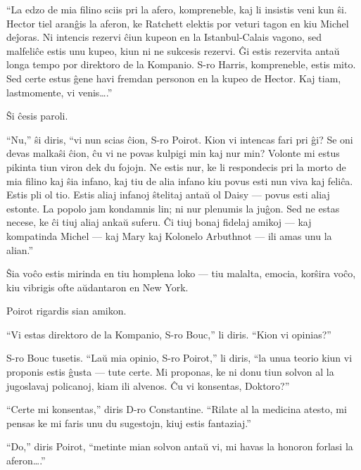 ``La edzo de mia filino sciis pri la afero, kompreneble, kaj li insistis veni kun ŝi. Hector tiel aranĝis la aferon, ke Ratchett elektis por veturi tagon en kiu Michel deĵoras. Ni intencis rezervi ĉiun kupeon en la Istanbul-Calais vagono, sed malfeliĉe estis unu kupeo, kiun ni ne sukcesis rezervi. Ĝi estis rezervita antaŭ longa tempo por direktoro de la Kompanio. S-ro Harris, kompreneble, estis mito. Sed certe estus ĝene havi fremdan personon en la kupeo de Hector. Kaj tiam, lastmomente, vi venis{\ldots}.''

Ŝi ĉesis paroli.

``Nu,'' ŝi diris, ``vi nun scias ĉion, S-ro Poirot. Kion vi intencas fari pri ĝi? Se oni devas malkaŝi ĉion, ĉu vi ne povas kulpigi min kaj nur min? Volonte mi estus pikinta tiun viron dek du fojojn. Ne estis nur, ke li respondecis pri la morto de mia filino kaj ŝia infano, kaj tiu de alia infano kiu povus esti nun viva kaj feliĉa. Estis pli ol tio. Estis aliaj infanoj ŝtelitaj antaŭ ol Daisy --- povus esti aliaj estonte. La popolo jam kondamnis lin; ni nur plenumis la juĝon. Sed ne estas necese, ke ĉi tiuj aliaj ankaŭ suferu. Ĉi tiuj bonaj fidelaj amikoj --- kaj kompatinda Michel --- kaj Mary kaj Kolonelo Arbuthnot --- ili amas unu la alian.''

Ŝia voĉo estis mirinda en tiu homplena loko --- tiu malalta, emocia, korŝira voĉo, kiu vibrigis ofte aŭdantaron en New York.

Poirot rigardis sian amikon.

``Vi estas direktoro de la Kompanio, S-ro Bouc,'' li diris. ``Kion vi opinias?''

S-ro Bouc tusetis. ``Laŭ mia opinio, S-ro Poirot,'' li diris, ``la unua teorio kiun vi proponis estis ĝusta --- tute certe. Mi proponas, ke ni donu tiun solvon al la jugoslavaj policanoj, kiam ili alvenos. Ĉu vi konsentas, Doktoro?''

``Certe mi konsentas,'' diris D-ro Constantine. ``Rilate al la medicina atesto, mi pensas ke mi faris unu du sugestojn, kiuj estis fantaziaj.''

``Do,'' diris Poirot, ``metinte mian solvon antaŭ vi, mi havas la honoron forlasi la aferon{\ldots}.''



